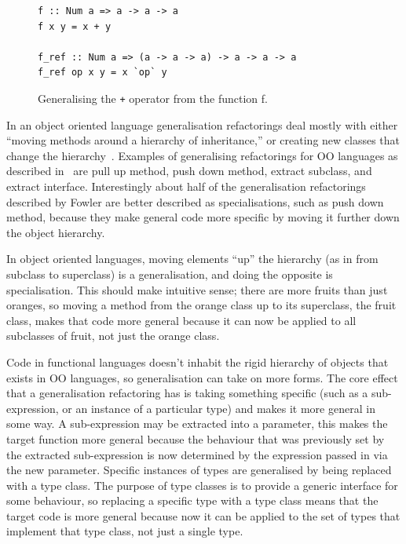 \begin{figure}[t]
\begin{lstlisting}
f :: Num a => a -> a -> a
f x y = x + y

f_ref :: Num a => (a -> a -> a) -> a -> a -> a
f_ref op x y = x `op` y
\end{lstlisting}
\caption{Generalising the \texttt{+} operator from the function f.}
\label{genOp}
\end{figure} 

In an object oriented language generalisation refactorings deal mostly with either ``moving methods around a hierarchy of inheritance,'' or creating new classes that change the hierarchy~\citep{fowler}. Examples of generalising refactorings for OO languages as described in~\citep{fowler} are pull up method, push down method, extract subclass, and extract interface. Interestingly about half of the generalisation refactorings described by Fowler are better described as specialisations, such as push down method, because they make general code more specific by moving it further down the object hierarchy.

In object oriented languages, moving elements ``up'' the hierarchy (as in from subclass to superclass) is a generalisation, and doing the opposite is specialisation. This should make intuitive sense; there are more fruits than just oranges, so moving a method from the orange class up to its superclass, the fruit class, makes that code more general because it can now be applied to all subclasses of fruit, not just the orange class.

Code in functional languages doesn't inhabit the rigid hierarchy of objects that exists in OO languages, so generalisation can take on more forms. The core effect that a generalisation refactoring has is taking something specific (such as a sub-expression, or an instance of a particular type) and makes it more general in some way. A sub-expression may be extracted into a parameter, this makes the target function more general because the behaviour that was previously set by the extracted sub-expression is now determined by the expression passed in via the new parameter. Specific instances of types are generalised by being replaced with a type class. The purpose of type classes is to provide a generic interface for some behaviour, so replacing a specific type with a type class means that the target code is more general because now it can be applied to the set of types that implement that type class, not just a single type.

